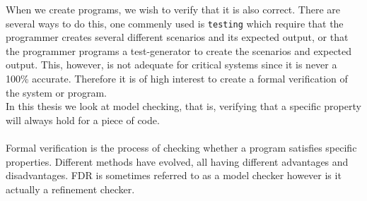 When we create programs, we wish to verify that it is also correct. There are several ways to do this, one commenly used is \texttt{testing} which require that the programmer creates several different scenarios and its expected output, or that the programmer programs a test-generator to create the scenarios and expected output. This, however, is not adequate for critical systems since it is never a 100\% accurate. Therefore it is of high interest to create a formal verification of the system or program.\\


In this thesis we look at model checking, that is, verifying that a specific property will always hold for a piece of code.
\\\\

Formal verification is the process of checking whether a program satisfies specific properties. Different methods have evolved, all having different advantages and disadvantages. FDR is sometimes referred to as a model checker however is it actually a refinement checker.
\\\\

